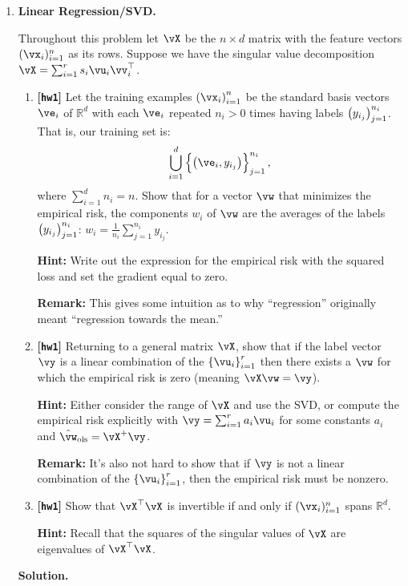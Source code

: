 \documentclass{article}
\def\R{\mathbb{R}}
\def\hw{\textbf{[\texttt{hw1}]}\xspace}
\theoremstyle{definition}
\theoremstyle{remark}
\newenvironment{Q}
{%
  \clearpage
  \item
  }
  {%
    \phantom{s} %
    \bigskip
    \textbf{Solution.}
  }
\begin{document}
  \begin{enumerate}[font={\Large\bfseries},left=0pt]
    \begin{Q}
  \textbf{\Large Linear Regression/SVD.}

  Throughout this problem let $\vX$ be the $n \times d$ matrix with the feature vectors $(\vx_i)_{i = 1}^n$ as its rows. Suppose we have the singular value decomposition $\vX = \sum_{i = 1}^r s_i \vu_i \vv_i^\top$.
  \begin{enumerate}
    \item \hw Let the training examples $\del{\vx_i}_{i = 1}^n$ be the standard basis vectors $\ve_i$ of $\R^d$ with each $\ve_i$ repeated $n_i > 0$ times having labels $\del{y_{i_j}}_{j = 1}^{n_i}$. That is, our training set is:
    \[
        \bigcup_{i = 1}^d \cbr{\del{\ve_i, y_{i_j}}}_{j = 1}^{n_i},
    \]
    where $\sum_{i = 1}^d n_i = n$. Show that for a vector $\vw$ that minimizes the empirical risk, the components $w_i$ of $\vw$ are the averages of the labels $\del{y_{i_j}}_{j = 1}^{n_i}$: $w_i = \frac{1}{n_i}\sum_{j = 1}^{n_i} y_{i_j}$.
    
    \textbf{Hint:} Write out the expression for the empirical risk with the squared loss and set the gradient equal to zero.
    
    \textbf{Remark:} This gives some intuition as to why ``regression'' originally meant ``regression towards the mean.''
    
    \item \hw Returning to a general matrix $\vX$, show that if the label vector $\vy$ is a linear combination of the $\cbr{\vu_i}_{i = 1}^r$ then there exists a $\vw$ for which the empirical risk is zero (meaning $\vX \vw = \vy$).
    
    \textbf{Hint:} Either consider the range of $\vX$ and use the SVD, or compute the empirical risk explicitly with $\vy = \sum_{i = 1}^r a_i \vu_i$ for some constants $a_i$ and $\hat{\vw}_{\textrm{ols}} = \vX^+ \vy$.
    
    \textbf{Remark:} It's also not hard to show that if $\vy$ is not a linear combination of the $\cbr{\vu_i}_{i = 1}^r$, then the empirical risk must be nonzero.
    
    \item \hw Show that $\vX^\top \vX$ is invertible if and only if $(\vx_i)_{i = 1}^n$ spans $\mathbb{R}^d$.
    
    \textbf{Hint:} Recall that the squares of the singular values of $\vX$ are eigenvalues of $\vX^\top \vX$.


\end{enumerate}
\end{Q}
\end{enumerate}
\end{document}
